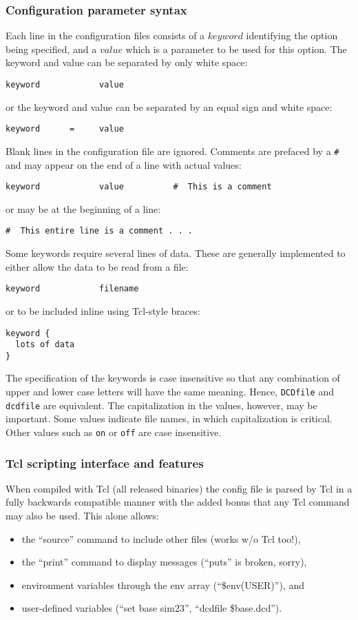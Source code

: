 \subsubsection{Configuration parameter syntax}
\label{section:configsyntax}
Each line
in the configuration files consists of a $keyword$ identifying the option
being specified, and a $value$ which is a parameter to be used for this
option.  The keyword and value can be separated by only white space:
\begin{verbatim}
keyword            value
\end{verbatim}
or the keyword and value can be separated by an equal sign and white space:
\begin{verbatim}
keyword      =     value
\end{verbatim}
Blank lines in the configuration file are ignored.  Comments are prefaced by
a \verb!#! and may appear on the end of a line with actual values:
\begin{verbatim}
keyword            value          #  This is a comment
\end{verbatim}
or may be at the beginning of a line:
\begin{verbatim}
#  This entire line is a comment . . . 
\end{verbatim}
Some keywords require several lines of data.
These are generally implemented to either allow the data to be read from a file:
\begin{verbatim}
keyword            filename
\end{verbatim}
or to be included inline using Tcl-style braces:
\begin{verbatim}
keyword {
  lots of data
}
\end{verbatim}

The specification of the keywords is case insensitive 
so that any combination of 
upper and lower case letters will have the same meaning.  
Hence, {\tt DCDfile} and {\tt dcdfile} 
are equivalent.  The capitalization in the values, however, may be important.
Some values indicate file names, in which capitalization is critical.  
Other values such as {\tt on} or {\tt off} are case insensitive.

\subsubsection{Tcl scripting interface and features}
\label{section:tclscripting}

When compiled with Tcl (all released binaries) the config file
is parsed by Tcl in a fully backwards compatible manner with the
added bonus that any Tcl command may also be used.  This alone allows:
\begin{itemize}
 \item the ``source'' command to include other files (works w/o Tcl too!),
 \item the ``print'' command to display messages (``puts'' is broken, sorry),
 \item environment variables through the env array (``\$env(USER)''), and
 \item user-defined variables (``set base sim23'', ``dcdfile \${base}.dcd'').
\end{itemize}

